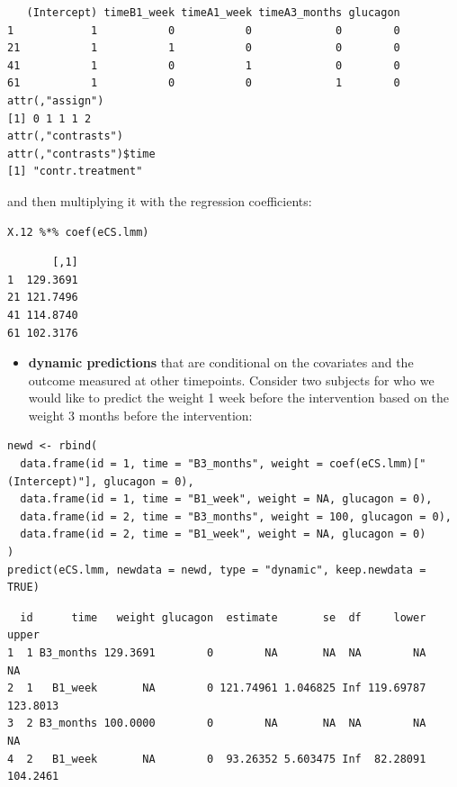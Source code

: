 \documentclass[12pt]{article}
\begin{document}
\begin{verbatim}
   (Intercept) timeB1_week timeA1_week timeA3_months glucagon
1            1           0           0             0        0
21           1           1           0             0        0
41           1           0           1             0        0
61           1           0           0             1        0
attr(,"assign")
[1] 0 1 1 1 2
attr(,"contrasts")
attr(,"contrasts")$time
[1] "contr.treatment"
\end{verbatim}

and then multiplying it with the regression coefficients:
\lstset{language=r,label= ,caption= ,captionpos=b,numbers=none}
\begin{lstlisting}
X.12 %*% coef(eCS.lmm)
\end{lstlisting}

\begin{verbatim}
       [,1]
1  129.3691
21 121.7496
41 114.8740
61 102.3176
\end{verbatim}


\clearpage

\begin{itemize}
\item \textbf{dynamic predictions} that are conditional on the covariates and the
outcome measured at other timepoints. Consider two subjects for who
we would like to predict the weight 1 week before the intervention
based on the weight 3 months before the intervention:
\end{itemize}

\begin{lstlisting}
newd <- rbind(
  data.frame(id = 1, time = "B3_months", weight = coef(eCS.lmm)["(Intercept)"], glucagon = 0),
  data.frame(id = 1, time = "B1_week", weight = NA, glucagon = 0),
  data.frame(id = 2, time = "B3_months", weight = 100, glucagon = 0),
  data.frame(id = 2, time = "B1_week", weight = NA, glucagon = 0)
)
predict(eCS.lmm, newdata = newd, type = "dynamic", keep.newdata = TRUE)
\end{lstlisting}

\begin{verbatim}
  id      time   weight glucagon  estimate       se  df     lower    upper
1  1 B3_months 129.3691        0        NA       NA  NA        NA       NA
2  1   B1_week       NA        0 121.74961 1.046825 Inf 119.69787 123.8013
3  2 B3_months 100.0000        0        NA       NA  NA        NA       NA
4  2   B1_week       NA        0  93.26352 5.603475 Inf  82.28091 104.2461
\end{verbatim}
\end{document}
